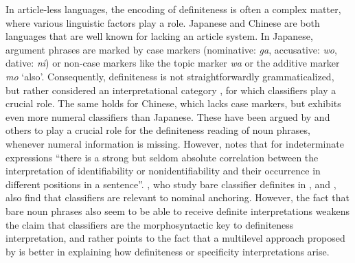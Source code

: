 \documentclass[output=paper]{langsci/langscibook}
\begin{document}
{
In article-less languages, the encoding of definiteness is often a complex matter, where various linguistic factors play a role. Japanese and Chinese are both languages that are well known for lacking an article system. In Japanese, argument phrases are marked by case markers (nominative: {\emph{ga}}, accusative: {\emph{wo}}, dative: {\emph{ni}}) or non-case markers like the topic marker {\emph{wa}} or the additive marker {\emph{mo}} `also'. Consequently, definiteness is not straightforwardly grammaticalized, but rather considered an interpretational category \citep[e.\,g.,][]{tawa:93}, for which classifiers play a crucial role. The same holds for Chinese, which lacks case markers, but exhibits even more numeral classifiers than Japanese. These have been argued by \citet{cheng:sybesma:99} and others to play a crucial role for the definiteness reading of noun phrases, whenever numeral information is missing. However, \citet[][p.1129]{peng:04} notes that for indeterminate expressions ``there is a strong but seldom absolute correlation between the interpretation of identifiability or nonidentifiability and their occurrence in different positions in a sentence''. \citet{simpson:etal:11}, who study bare classifier definites in ,  and , also find that classifiers are relevant to nominal anchoring. However, the fact that bare noun phrases also seem to be able to receive definite interpretations weakens the claim that classifiers are the morphosyntactic key to definiteness interpretation, and rather points to the fact that a multilevel approach  proposed by \citet{heine:98} is better in explaining how definiteness or specificity interpretations arise. 
}
\end{document}
